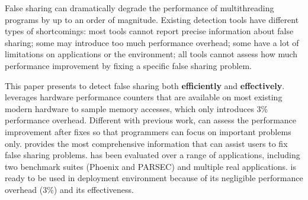 False sharing can dramatically degrade the performance of multithreading programs by up to an order of magnitude. 
Existing detection tools have different types of shortcomings: most tools cannot report precise information about false sharing; some may introduce too much performance overhead; some have a lot of limitations on applications or the environment; all tools cannot assess how much performance improvement by fixing a specific false sharing problem. 

This paper presents \cheetah{} to detect false sharing both {\bf efficiently} and {\bf effectively}. \cheetah{} leverages hardware performance counters that are available on most existing modern hardware to sample memory accesses, which only introduces 3\% performance overhead. Different with previous work, \cheetah{} can assess the performance improvement after fixes so that programmers can focus on important problems only. \cheetah{} provides the most comprehensive information that can assist users to fix false sharing problems. \cheetah{} has been evaluated over a range of applications, including two benchmark suites (Phoenix and PARSEC) and multiple real applications. \Cheetah{} is ready to be used in deployment environment because of its negligible performance overhead (3\%) and its effectiveness.  